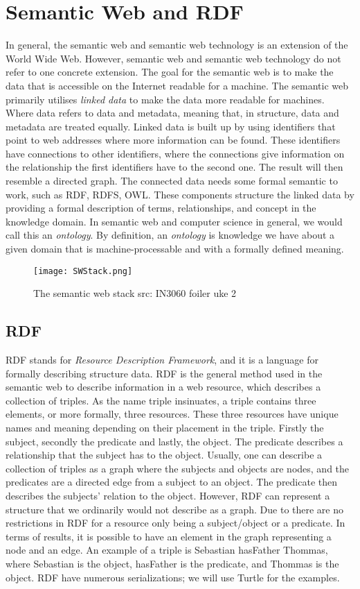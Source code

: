 \section{Semantic Web and RDF}
In general, the semantic web and semantic web technology is an extension of the World Wide Web. However, semantic web and semantic web technology do not refer to one concrete extension. The goal for the semantic web is to make the data that is accessible on the Internet readable for a machine. The semantic web primarily utilises \emph{linked data} to make the data more readable for machines. Where data refers to data and metadata, meaning that, in structure, data and metadata are treated equally.  Linked data is built up by using identifiers that point to web addresses where more information can be found. These identifiers have connections to other identifiers, where the connections give information on the relationship the first identifiers have to the second one. The result will then resemble a directed graph. The connected data needs some formal semantic to work, such as RDF, RDFS, OWL.  These components structure the linked data by providing a formal description of terms, relationships, and concept in the knowledge domain. In semantic web and computer science in general, we would call this an \emph{ontology}. By definition, an \emph{ontology} is knowledge we have about a given domain that is machine-processable and with a formally defined meaning.

\begin{figure}
    \centering
    \texttt{[image: SWStack.png]}
    \caption{The semantic web stack src: IN3060 foiler uke 2}
    \label{fig:SW stack}
\end{figure}


\subsection{RDF}
RDF stands for \emph{Resource Description Framework}, and it is a language for formally describing structure data. RDF is the general method used in the semantic web to describe information in a web resource,  which describes a collection of triples. As the name triple insinuates, a triple contains three elements, or more formally, three resources. These three resources have unique names and meaning depending on their placement in the triple. Firstly the subject, secondly the predicate and lastly, the object. The predicate describes a relationship that the subject has to the object. Usually, one can describe a collection of triples as a graph where the subjects and objects are nodes, and the predicates are a directed edge from a subject to an object. The predicate then describes the subjects' relation to the object. However, RDF can represent a structure that we ordinarily would not describe as a graph. Due to there are no restrictions in RDF for a resource only being a subject/object or a predicate. In terms of results, it is possible to have an element in the graph representing a node and an edge.  An example of a triple is Sebastian hasFather Thommas, where Sebastian is the object, hasFather is the predicate, and Thommas is the object. RDF have numerous serializations; we will use Turtle for the examples. 


